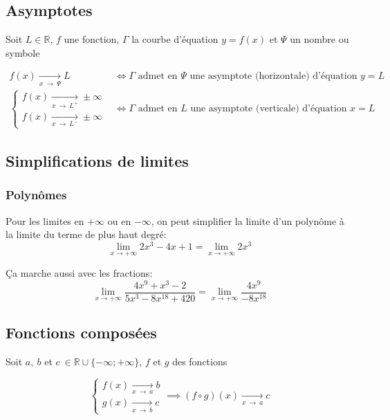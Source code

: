 \documentclass{article}
\newcommand{\R}{\mathds{R}}
\newcommand{\oo}{\infty}
\newcommand{\goesto}[2]{\xrightarrow[#1\:\to\:#2]{}}
\newcommand{\liminfty}{\lim_{x\to+\oo}}
\begin{document}
\subsection{Asymptotes}

Soit $L \in \R$, $f$ une fonction, $\Gamma$ la courbe d'équation $y = f(x)$ et $\Psi$ un nombre ou symbole

\begin{equation*}
    \begin{split}
        f(x) \goesto{x}{\Psi} L &\iff \text{$\Gamma$ admet en $\Psi$ une asymptote (horizontale) d'équation $y = L$}\\
        \begin{cases}
            f(x) \goesto{x}{L^+} \pm\oo\\
            f(x) \goesto{x}{L^-} \pm\oo
        \end{cases} &\iff \text{$\Gamma$ admet en $L$ une asymptote (verticale) d'équation $x = L$}
    \end{split}
\end{equation*}

\subsection{Simplifications de limites}

\subsubsection{Polynômes}

Pour les limites en $+\oo$ ou en $-\oo$, on peut simplifier la limite d'un polynôme à la limite du terme de plus haut degré:
\[\liminfty 2x^3 - 4x + 1 = \liminfty 2x^3\]

Ça marche aussi avec les fractions:
\[\liminfty \frac{4x^9 + x^3 - 2}{5x^3 - 8x^{18} + 420} = \liminfty \frac{4x^9}{-8x^{18}}\]

\subsection{Fonctions composées}

Soit $a,\:b$ et $c\:\in \R \cup \{ -\oo; +\oo \}$, $f$ et $g$ des fonctions

$$\begin{cases}
f(x) \goesto{x}{a} b\\
g(x) \goesto{x}{b} c
\end{cases} \implies (f \circ g)(x) \goesto{x}{a} c$$

\newpage
\end{document}

